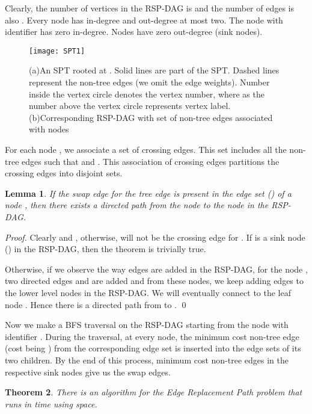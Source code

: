 \documentclass[11pt,a4paper]{llncs}
\newtheorem{thm}{Theorem}
\newtheorem{lem}[thm]{Lemma}
\begin{document}
Clearly, the number of vertices in the RSP-DAG is  and the number of edges is also
. Every node has in-degree and out-degree at most two.
The node with identifier  has zero in-degree. Nodes 
have zero out-degree (sink nodes).

\begin{figure}[!ht]
\centering
\texttt{[image: SPT1]}
\caption{(a)An SPT rooted at . Solid lines are part of the SPT. Dashed lines represent
the non-tree edges (we omit the edge weights). Number inside the vertex circle denotes the vertex number, where as
the number above the vertex circle represents vertex label.\newline
(b)Corresponding RSP-DAG with set of non-tree edges associated with nodes} \label{fig2}
\end{figure}

For each node , we associate a set  of crossing edges.
This set includes all the non-tree edges  such that  and .
This association of crossing edges partitions the crossing edges into disjoint sets.

\begin{lem}
If the swap edge  for the tree edge  is present in
the edge set () of a node , then there exists a directed path
from the node  to the node  in the RSP-DAG.
\end{lem}
\begin{proof}
Clearly  and , otherwise,  will not be the crossing
edge for . If  is a sink node () in the RSP-DAG, then
the theorem is trivially true.

Otherwise, if we observe the way edges are added in the RSP-DAG, for the node
, two directed edges  and 
are added and from these nodes, we keep adding edges to the lower level nodes in the RSP-DAG. We will
eventually connect to the leaf node . Hence there is
a directed path from  to .
\qed
\end{proof}

Now we make a BFS traversal on the RSP-DAG starting from the node with identifier
. During the traversal, at every node, the minimum cost non-tree edge 
(cost being ) from the corresponding edge set is inserted into the edge sets of its
two children. By the end of this process, minimum cost non-tree edges in the respective
sink nodes give us the swap edges.

\begin{thm}
\label{thm2}
There is an algorithm for
the Edge Replacement Path problem that runs in  time using  space.
\end{thm}
\end{document}
